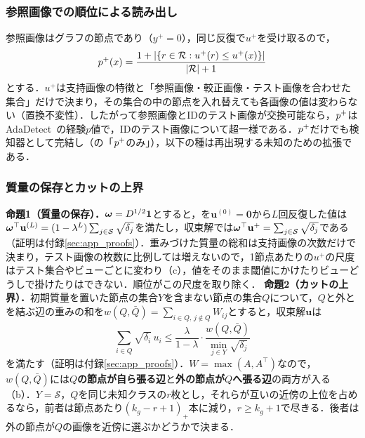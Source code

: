 \subsubsection{参照画像での順位による読み出し}
参照画像はグラフの節点であり（$y^{+}=0$），同じ反復で$u^{+}$を受け取るので，
\begin{equation}
p^{+}(x)=\frac{1+|\{r\in\mathcal{R}:u^{+}(r)\le u^{+}(x)\}|}{|\mathcal{R}|+1}
\label{eq:plp}
\end{equation}
とする．$u^{+}$は支持画像の特徴と「参照画像・較正画像・テスト画像を合わせた集合」だけで決まり，その集合の中の節点を入れ替えても各画像の値は変わらない（置換不変性）．したがって参照画像とIDのテスト画像が交換可能なら，$p^{+}$はAdaDetect~\cite{marandon2024adadetect}の経験$p$値で，IDのテスト画像について超一様である．$p^{+}$だけでも検知器として完結し（の「$p^{+}$のみ」），以下の種は再出現する未知のための拡張である．

\subsubsection{質量の保存とカットの上界}
\label{sec:mass}
\textbf{命題1（質量の保存）．}$\boldsymbol{\omega}=D^{1/2}\mathbf{1}$とすると，を$\mathbf{u}^{(0)}=\mathbf{0}$から$L$回反復した値は$\boldsymbol{\omega}^{\top}\mathbf{u}^{(L)}=(1-\lambda^{L})\sum_{j\in\mathcal{S}}\sqrt{\delta_j}$を満たし，収束解では$\boldsymbol{\omega}^{\top}\mathbf{u}^{+}=\sum_{j\in\mathcal{S}}\sqrt{\delta_j}$である（証明は付録\ref{sec:app_proofs}）．重みづけた質量の総和は支持画像の次数だけで決まり，テスト画像の枚数に比例しては増えないので，1節点あたりの$u^{+}$の尺度はテスト集合やビューごとに変わり（c），値をそのまま閾値にかけたりビューどうしで掛けたりはできない．順位がこの尺度を取り除く．
\label{sec:cut}
\textbf{命題2（カットの上界）．}初期質量を置いた節点の集合$Y$を含まない節点の集合$Q$について，$Q$と外とを結ぶ辺の重みの和を$w(Q,\bar{Q})=\sum_{i\in Q,\,j\notin Q}W_{ij}$とすると，収束解$\mathbf{u}$は
\begin{equation}
\sum_{i\in Q}\sqrt{\delta_i}\,u_i\le\frac{\lambda}{1-\lambda}\cdot\frac{w(Q,\bar{Q})}{\min_{j\in Y}\sqrt{\delta_j}}
\label{eq:cond}
\end{equation}
を満たす（証明は付録\ref{sec:app_proofs}）．$W=\max(A,A^{\top})$なので，$w(Q,\bar{Q})$には\textbf{$Q$の節点が自ら張る辺}と\textbf{外の節点が$Q$へ張る辺}の両方が入る（b）．$Y=\mathcal{S}$，$Q$を同じ未知クラスの$r$枚とし，それらが互いの近傍の上位を占めるなら，前者は節点あたり$(k_g-r+1)_+$本に減り，$r\ge k_g+1$で尽きる．後者は外の節点が$Q$の画像を近傍に選ぶかどうかで決まる．


